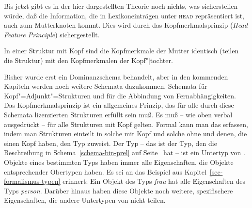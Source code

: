 Bis jetzt gibt es in der hier dargestellten Theorie noch nichts, was sicherstellen
würde, daß die Information, die in Lexikoneinträgen unter \textsc{head} repräsentiert
ist, auch zum Mutterknoten kommt. Dies wird durch das Kopfmerkmalsprinzip (\emph{Head Feature Principle})
sichergestellt.
\begin{prinzip-break}
\label{prinzip-hfp}
In einer Struktur mit Kopf sind die Kopfmerkmale der Mutter identisch (teilen die Struktur)
mit den Kopfmerkmalen der Kopf"|tochter.
\end{prinzip-break}
Bisher wurde erst ein Dominanzschema behandelt, aber in den kommenden Kapiteln werden
noch weitere Schemata dazukommen, \zb Schemata für Kopf"=Adjunkt"=Strukturen und
für die Abbindung von Fernabhängigkeiten. Das Kopfmerkmalsprinzip ist ein allgemeines Prinzip,
das für alle durch diese Schemata lizenzierten Strukturen erfüllt sein muß. Es muß --
wie oben verbal ausgedrückt -- für alle Strukturen mit Kopf gelten. Formal kann man
das erfassen, indem man Strukturen einteilt in solche mit Kopf und solche ohne
und denen, die einen Kopf haben, den Typ  zuweist.
Der Typ  -- das ist der Typ, den die Beschreibung in
Schema~\ref{schema-bin-prel} auf Seite~\pageref{schema-bin-prel} hat -- ist ein Untertyp
von . Objekte eines bestimmten Typs haben immer 
alle Eigenschaften, die Objekte entsprechender Obertypen haben. Es sei an das Beispiel
aus Kapitel~\ref{sec-formalismus-typen} erinnert: Ein Objekt des Typs \textit{frau}
hat alle Eigenschaften des Typs \textit{person}. Darüber hinaus haben diese Objekte
noch weitere, spezifischere Eigenschaften, die andere Untertypen von 
nicht teilen.

